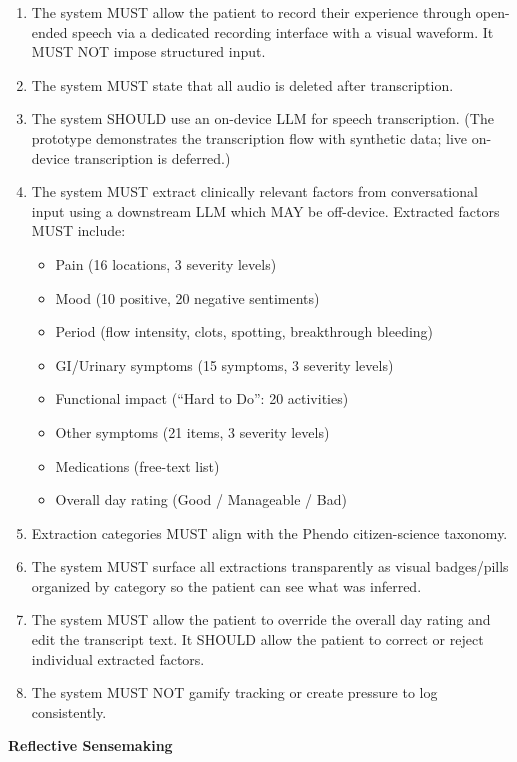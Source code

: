 \begin{enumerate}
  \item The system MUST allow the patient to record their experience through open-ended speech via a dedicated recording interface with a visual waveform. It MUST NOT impose structured input.
  \item The system MUST state that all audio is deleted after transcription.
  \item The system SHOULD use an on-device LLM for speech transcription. (The prototype demonstrates the transcription flow with synthetic data; live on-device transcription is deferred.)
  \item The system MUST extract clinically relevant factors from conversational input using a downstream LLM which MAY be off-device. Extracted factors MUST include:
        \begin{itemize}
          \item Pain (16 locations, 3 severity levels)
          \item Mood (10 positive, 20 negative sentiments)
          \item Period (flow intensity, clots, spotting, breakthrough bleeding)
          \item GI/Urinary symptoms (15 symptoms, 3 severity levels)
          \item Functional impact (``Hard to Do'': 20 activities)
          \item Other symptoms (21 items, 3 severity levels)
          \item Medications (free-text list)
          \item Overall day rating (Good / Manageable / Bad)
        \end{itemize}
  \item Extraction categories MUST align with the Phendo citizen-science taxonomy.
  \item The system MUST surface all extractions transparently as visual badges/pills organized by category so the patient can see what was inferred.
  \item The system MUST allow the patient to override the overall day rating and edit the transcript text. It SHOULD allow the patient to correct or reject individual extracted factors.
  \item The system MUST NOT gamify tracking or create pressure to log consistently.
\end{enumerate}

\textbf{Reflective Sensemaking}


